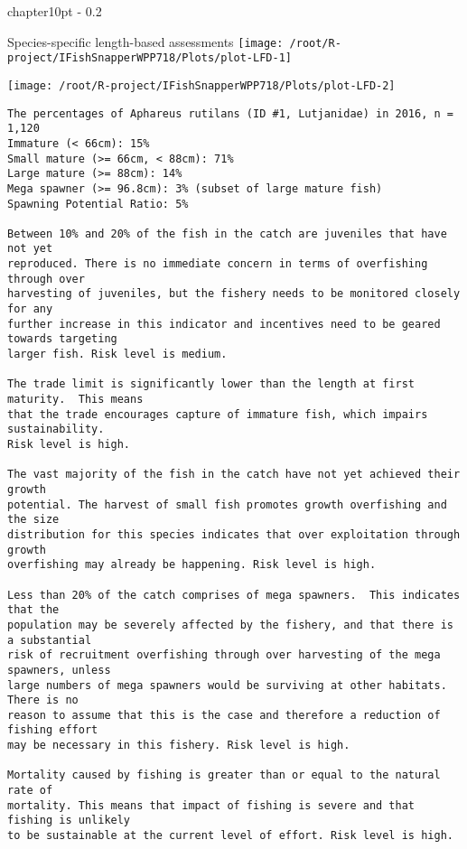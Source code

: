 \documentclass{report}\usepackage[]{graphicx}\usepackage[]{color}
\makeatletter
\def\maxwidth{ %
  \ifdim\Gin@nat@width>\linewidth
    \linewidth
  \else
    \Gin@nat@width
  \fi
}
\newenvironment{kframe}{%
 \def\at@end@of@kframe{}%
 \ifinner\ifhmode%
  \def\at@end@of@kframe{\end{minipage}}%
  \begin{minipage}{\columnwidth}%
 \fi\fi%
 \def\FrameCommand##1{\hskip\@totalleftmargin \hskip-\fboxsep
 \colorbox{shadecolor}{##1}\hskip-\fboxsep
     \hskip-\linewidth \hskip-\@totalleftmargin \hskip\columnwidth}%
 \MakeFramed {\advance\hsize-\width
   \@totalleftmargin\z@ \linewidth\hsize
   \@setminipage}}%
 {\par\unskip\endMakeFramed%
 \at@end@of@kframe}
\newenvironment{knitrout}{}{} %
\newcommand{\verbatimfont}[1]{\def\verbatim@font{#1}}%
\renewcommand\chapter{\@startsection%
{chapter}{1}{0pt}%
{-\baselineskip}%
{0.2\baselineskip}%
{\raggedright\bf}}%
\makeatother
\begin{document}
\newpage

\chapter{Species-specific length-based assessments}
\verbatimfont{\normalfont\rmfamily}
\begin{knitrout}
\color{fgcolor}
\texttt{[image: /root/R-project/IFishSnapperWPP718/Plots/plot-LFD-1]} 

\texttt{[image: /root/R-project/IFishSnapperWPP718/Plots/plot-LFD-2]} 
\begin{kframe}\begin{verbatim}
The percentages of Aphareus rutilans (ID #1, Lutjanidae) in 2016, n = 1,120
Immature (< 66cm): 15%
Small mature (>= 66cm, < 88cm): 71%
Large mature (>= 88cm): 14%
Mega spawner (>= 96.8cm): 3% (subset of large mature fish)
Spawning Potential Ratio: 5%
 
Between 10% and 20% of the fish in the catch are juveniles that have not yet
reproduced. There is no immediate concern in terms of overfishing through over
harvesting of juveniles, but the fishery needs to be monitored closely for any
further increase in this indicator and incentives need to be geared towards targeting
larger fish. Risk level is medium.

The trade limit is significantly lower than the length at first maturity.  This means
that the trade encourages capture of immature fish, which impairs sustainability.
Risk level is high.

The vast majority of the fish in the catch have not yet achieved their growth
potential. The harvest of small fish promotes growth overfishing and the size
distribution for this species indicates that over exploitation through growth
overfishing may already be happening. Risk level is high.

Less than 20% of the catch comprises of mega spawners.  This indicates that the
population may be severely affected by the fishery, and that there is a substantial
risk of recruitment overfishing through over harvesting of the mega spawners, unless
large numbers of mega spawners would be surviving at other habitats. There is no
reason to assume that this is the case and therefore a reduction of fishing effort
may be necessary in this fishery. Risk level is high.
 
Mortality caused by fishing is greater than or equal to the natural rate of
mortality. This means that impact of fishing is severe and that fishing is unlikely
to be sustainable at the current level of effort. Risk level is high.
 

\end{verbatim}
\end{kframe}
\end{knitrout}
\end{document}
